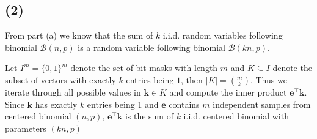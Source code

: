 \documentclass{article}
\begin{document}
\subsection*{(2)}
From part (a) we know that the sum of $k$ i.i.d. random variables following binomial $\mathcal{B}(n, p)$ is a random variable following binomial $\mathcal{B}(kn, p)$.

Let $I^m = \{0, 1\}^m$ denote the set of bit-masks with length $m$ and $K \subseteq I$ denote the subset of vectors with exactly $k$ entries being $1$, then $\vert K \vert = \binom{m}{k}$. Thus we iterate through all possible values in $\mathbf{k} \in K$ and compute the inner product $\mathbf{e}^\intercal \mathbf{k}$. Since $\mathbf{k}$ has exactly $k$ entries being 1 and $\mathbf{e}$ contains $m$ independent samples from centered binomial $(n, p)$, $\mathbf{e}^\intercal\mathbf{k}$ is the sum of $k$ i.i.d. centered binomial with parameters $(kn, p)$
\end{document}
